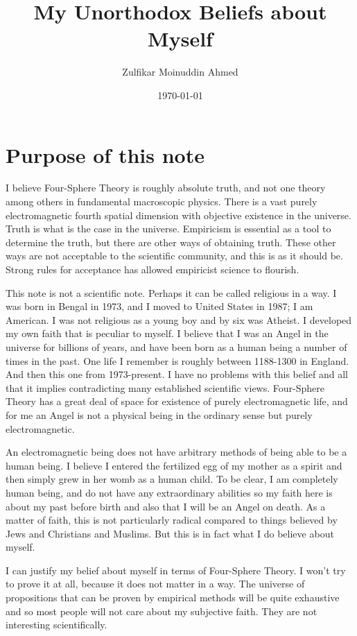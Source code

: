 \documentclass{amsart}
\title{My Unorthodox Beliefs about Myself}
\author{Zulfikar Moinuddin Ahmed}
\date{\today}
\begin{document}
\maketitle

\section{Purpose of this note}

I believe Four-Sphere Theory is roughly absolute truth, and not one theory among others in fundamental macroscopic physics.  There is a vast purely electromagnetic fourth spatial dimension with objective existence in the universe.  Truth is what is the case in the universe.  Empiricism is essential as a tool to determine the truth, but there are other ways of obtaining truth.  These other ways are not acceptable to the scientific community, and this is as it should be.  Strong rules for acceptance has allowed empiricist science to flourish.

This note is not a scientific note.  Perhaps it can be called religious in a way.  I was born in Bengal in 1973, and I moved to United States in 1987; I am American.  I was not religious as a young boy and by six was Atheist.  I developed my own faith that is peculiar to myself.  I believe that I was an Angel in the universe for billions of years, and have been born as a human being a number of times in the past.  One life I remember is roughly between 1188-1300 in England.  And then this one from 1973-present.   I have no problems with this belief and all that it implies contradicting many established scientific views.  Four-Sphere Theory has a great deal of space for existence of purely electromagnetic life, and for me an Angel is not a physical being in the ordinary sense but purely electromagnetic.

An electromagnetic being does not have arbitrary methods of being able to be a human being.  I believe I entered the fertilized egg of my mother as a spirit and then simply grew in her womb as a human child.  To be clear, I am completely human being, and do not have any extraordinary abilities so my faith here is about my past before birth and also that I will be an Angel on death.  As a matter of faith, this is not particularly radical compared to things believed by Jews and Christians and Muslims.  But this is in fact what I do believe about myself.  

I can justify my belief about myself in terms of Four-Sphere Theory.  I won't try to prove it at all, because it does not matter in a way.  The universe of propositions that can be proven by empirical methods will be quite exhaustive and so most people will not care about my subjective faith.  They are not interesting scientifically.  
\end{document}
